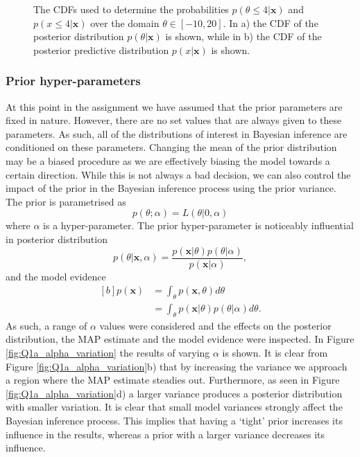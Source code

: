 \documentclass{article}
\begin{document}
\begin{figure}
     \caption{The CDFs used to determine the probabilities $p(\theta \leq 4 \vert \mathbf{x})$ and $p(x \leq 4 \vert \mathbf{x})$ over the domain $\theta \in [-10, 20]$. In a) the CDF of the posterior distribution $p(\theta \vert \mathbf{x})$ is shown, while in b) the CDF of the posterior predictive distribution $p(x \vert \mathbf{x})$ is shown.}
     \label{fig:Q1a_CDFs}
\end{figure}

\subsubsection{Prior hyper-parameters}
At this point in the assignment we have assumed that the prior parameters are fixed in nature. However, there are no set values that are always given to these parameters. As such, all of the distributions of interest in Bayesian inference are conditioned on these parameters. Changing the mean of the prior distribution may be a biased procedure as we are effectively biasing the model towards a certain direction. While this is not always a bad decision, we can also control the impact of the prior in the Bayesian inference process using the prior variance. The prior is parametrised as 
\begin{equation}
p(\theta; \alpha) = L(\theta \vert 0, \alpha)
\end{equation}
where $\alpha$ is a hyper-parameter. The prior hyper-parameter is noticeably influential in posterior distribution
\begin{equation}
p(\theta \vert \mathbf{x}, \alpha) = \frac{p(\mathbf{x}\vert \theta)p(\theta \vert \alpha)}{p(\mathbf{x} \vert \alpha)},
\end{equation}
and the model evidence
\begin{equation}
\begin{aligned}[b]
p(\mathbf{x}) &= \int_\theta p(\mathbf{x}, \theta) d\theta \\
&= \int_\theta p(\mathbf{x} \vert \theta) p(\theta \vert \alpha) d\theta.
\end{aligned}
\end{equation}
As such, a range of $\alpha$ values were considered and the effects on the posterior distribution, the MAP estimate and the model evidence were inspected. In Figure \ref{fig:Q1a_alpha_variation} the results of varying $\alpha$ is shown. It is clear from Figure \ref{fig:Q1a_alpha_variation}b) that by increasing the variance we approach a region where the MAP estimate steadies out. Furthermore, as seen in Figure \ref{fig:Q1a_alpha_variation}d) a larger variance produces a posterior distribution with smaller variation. It is clear that small model variances strongly affect the Bayesian inference process. This implies that having a `tight' prior increases its influence in the results, whereas a prior with a larger variance decreases its influence.
\end{document}
